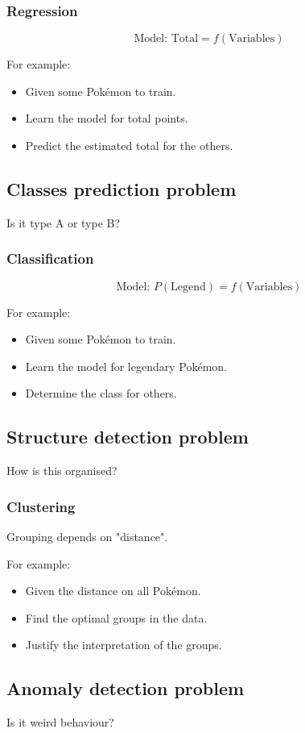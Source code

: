\documentclass[11pt]{article}
\begin{document}
\subsubsection{Regression}
\label{sec:org964d0bb}
\[\text{Model: Total} = f(\text{Variables}) \]

For example:
\begin{itemize}
\item Given some Pokémon to train.
\item Learn the model for total points.
\item Predict the estimated total for the others.
\end{itemize}
\subsection{Classes prediction problem}
\label{sec:org8752454}
Is it type A or type B?
\subsubsection{Classification}
\label{sec:org0a117b4}
\[\text{Model: } P (\text{Legend}) = f(\text{Variables})\]

For example:
\begin{itemize}
\item Given some Pokémon to train.
\item Learn the model for legendary Pokémon.
\item Determine the class for others.
\end{itemize}
\subsection{Structure detection problem}
\label{sec:org7513466}
How is this organised?
\subsubsection{Clustering}
\label{sec:org71c6f18}
Grouping depends on "distance".

For example:
\begin{itemize}
\item Given the distance on all Pokémon.
\item Find the optimal groups in the data.
\item Justify the interpretation of the groups.
\end{itemize}
\subsection{Anomaly detection problem}
\label{sec:org8bf0aa7}
Is it weird behaviour?
\end{document}
